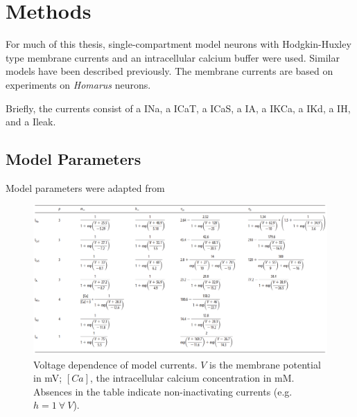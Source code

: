 \chapter{Methods}\label{ch:methods}
For much of this thesis, single-compartment model neurons with Hodgkin-Huxley type membrane currents and an intracellular calcium buffer were used\autocite{HodgkinMeasurementcurrentvoltagerelations1952, Hodgkincomponentsmembraneconductance1952, Hodgkinquantitativedescriptionmembrane1952}. Similar models have been described previously\autocite{Liumodelneuronactivitydependent1998, PrinzAlternativehandtuningconductancebased2003, PrinzSimilarnetworkactivity2004, SoofiPhasemaintenancerhythmic2014}. The membrane currents are based on experiments on \textit{Homarus} neurons\autocite{TurrigianoSelectiveregulationcurrent1995}. 

Briefly, the currents consist of a \ac{INa}, a \ac{ICaT}, a \ac{ICaS}, a \ac{IA}, a \ac{IKCa}, a \ac{IKd}, a \ac{IH}, and a \ac{Ileak}.

\section{Model Parameters}
Model parameters were adapted from \autocite{PrinzAlternativehandtuningconductancebased2003, PrinzSimilarnetworkactivity2004}

\begin{figure}[h]
	\centering
	\includegraphics[width=1.0\linewidth]{gfx/VoltageDependence}
	\caption[Voltage dependence for model currents]{Voltage dependence of model currents. $V$ is the membrane potential in mV; $[Ca]$, the intracellular calcium concentration in mM. Absences in the table indicate non-inactivating currents (e.g. $h = 1 ~\forall~ V$).}
	\label{fig:voltagedependence}
\end{figure}

